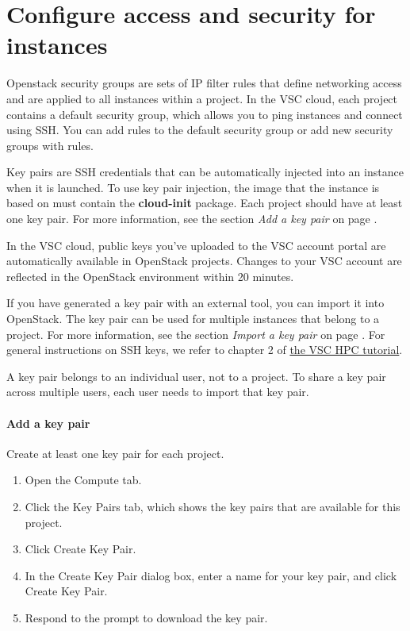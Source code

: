 \chapter{Configure access and security for instances}
Openstack security groups are sets of IP filter rules that define
networking access and are applied to all instances within a project.
In the VSC cloud, each project contains a default security group,
which allows you to ping instances and connect using SSH.  You can add
rules to the default security group or add new security groups with
rules.

Key pairs are SSH credentials that can be automatically injected into
an instance when it is launched. To use key pair injection, the image
that the instance is based on must contain the \textbf{cloud-init}
package. Each project should have at least one key pair. For more
information, see the section \emph{Add a key pair} on page
\pageref{add-a-key-pair}.

 In the VSC cloud, public keys you've uploaded to the
VSC account portal are automatically available in OpenStack projects.
Changes to your VSC account are reflected in the OpenStack environment
within 20 minutes.

If you have generated a key pair with an external tool, you can import
it into \gls{OpenStack}. The key pair can be used for multiple
instances that belong to a project. For more information, see the
section {\emph{Import a key pair}} on page
\pageref{import-a-key-pair}.  For general instructions on SSH keys, we
refer to chapter 2 of
\href{https://www.vscentrum.be/support/tut-book/vsc-tutorials}{the VSC
  HPC tutorial}.

 A key pair belongs to an individual user, not to a
project. To share a key pair across multiple users, each user needs to
import that key pair.

\subsubsection{Add a key pair}\label{add-a-key-pair}
Create at least one key pair for each project.

\begin{enumerate}
\item Open the Compute tab.
\item Click the Key Pairs tab, which shows the key pairs that are
  available for this project.
\item Click Create Key Pair.
\item In the Create Key Pair dialog box, enter a name for your key
  pair, and click Create Key Pair.
\item Respond to the prompt to download the key pair.
  \end{enumerate}

